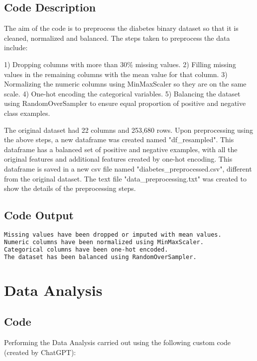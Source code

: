 \documentclass[12pt]{article}
\begin{document}
\subsection{Code Description}

The aim of the code is to preprocess the diabetes binary dataset so that it is cleaned, normalized and balanced. The steps taken to preprocess the data include:

1) Dropping columns with more than 30\% missing values.
2) Filling missing values in the remaining columns with the mean value for that column.
3) Normalizing the numeric columns using MinMaxScaler so they are on the same scale.
4) One-hot encoding the categorical variables.
5) Balancing the dataset using RandomOverSampler to ensure equal proportion of positive and negative class examples.

The original dataset had 22 columns and 253,680 rows. Upon preprocessing using the above steps, a new dataframe was created named "df\_resampled". This dataframe has a balanced set of positive and negative examples, with all the original features and additional features created by one-hot encoding. This dataframe is saved in a new csv file named "diabetes\_preprocessed.csv", different from the original dataset. The text file "data\_preprocessing.txt" was created to show the details of the preprocessing steps.

\subsection{Code Output}

\begin{lstlisting}[language=TeX]
Missing values have been dropped or imputed with mean values.
Numeric columns have been normalized using MinMaxScaler.
Categorical columns have been one-hot encoded.
The dataset has been balanced using RandomOverSampler.

\end{lstlisting}

\section{Data Analysis} \subsection{Code}Performing the Data Analysis carried out using the following custom code (created by ChatGPT):
\end{document}
